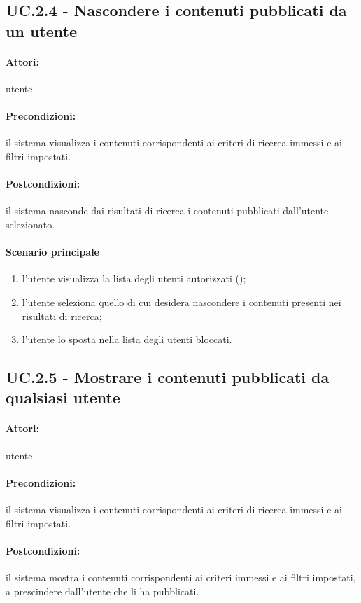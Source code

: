 \documentclass[10pt,a4paper,headinclude,footinclude,hidelinks]{scrreprt} %
\begin{document}
	\subsection[UC.2.4]{UC.2.4 - Nascondere i contenuti pubblicati da un utente}
	\label{sec:stage:ar:uc:2_4}
	\paragraph{Attori:} utente
	\paragraph{Precondizioni:} il sistema visualizza i contenuti corrispondenti ai criteri di ricerca immessi e ai filtri impostati.
	\paragraph{Postcondizioni:} il sistema nasconde dai risultati di ricerca i contenuti pubblicati dall'utente selezionato.
	\paragraph{Scenario principale}
	\begin{enumerate}
	\item l'utente visualizza la lista degli utenti autorizzati ();
	\item l'utente seleziona quello di cui desidera nascondere i contenuti presenti nei risultati di ricerca;
	\item l'utente lo sposta nella lista degli utenti bloccati.
	\end{enumerate}

	\subsection[UC.2.5]{UC.2.5 - Mostrare i contenuti pubblicati da qualsiasi utente}
	\label{sec:stage:ar:uc:2_5}
	\paragraph{Attori:} utente
	\paragraph{Precondizioni:} il sistema visualizza i contenuti corrispondenti ai criteri di ricerca immessi e ai filtri impostati.
	\paragraph{Postcondizioni:} il sistema mostra i contenuti corrispondenti ai criteri immessi e ai filtri impostati, a prescindere dall'utente che li ha pubblicati.
\end{document}
